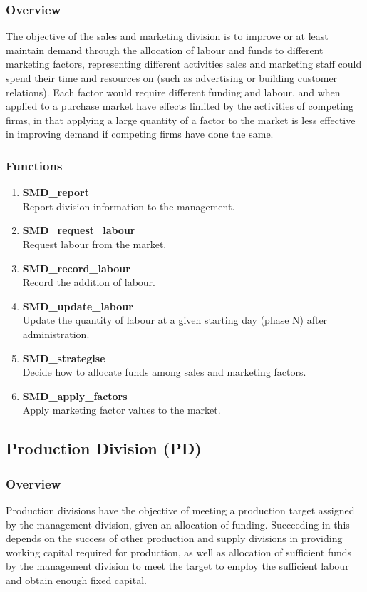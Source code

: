 \documentclass[11pt]{article}
\begin{document}
\subsubsection{Overview}
The objective of the sales and marketing division is to improve or at least maintain demand through the allocation of labour and funds to different marketing factors, representing different activities sales and marketing staff could spend their time and resources on (such as advertising or building customer relations). Each factor would require different funding and labour, and when applied to a purchase market have effects limited by the activities of competing firms, in that applying a large quantity of a factor to the market is less effective in improving demand if competing firms have done the same. 

\subsubsection{Functions}
\begin{enumerate}
	\item \textbf{SMD\_report} \\
	Report division information to the management.
	\item \textbf{SMD\_request\_labour} \\
	Request labour from the market.
	\item \textbf{SMD\_record\_labour} \\
	Record the addition of labour.
	\item \textbf{SMD\_update\_labour} \\
	Update the quantity of labour at a given starting day (phase N) after administration.
	\item \textbf{SMD\_strategise} \\
	Decide how to allocate funds among sales and marketing factors.
	\item \textbf{SMD\_apply\_factors} \\
	Apply marketing factor values to the market.
\end{enumerate}

\subsection{Production Division (PD)}

\subsubsection{Overview}
Production divisions have the objective of meeting a production target assigned by the management division, given an allocation of funding. Succeeding in this depends on the success of other  production and supply divisions in providing working capital required for production, as well as allocation of sufficient funds by the management division to meet the target to employ the sufficient labour and obtain enough fixed capital.
\end{document}
